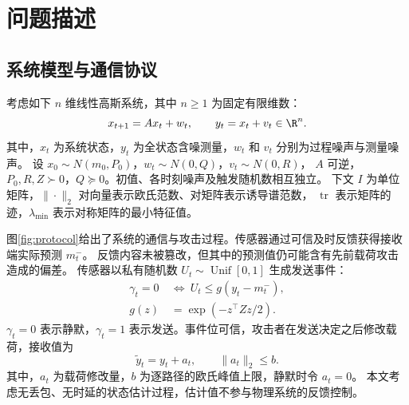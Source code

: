 \section{问题描述}
\label{sec:model}
\subsection{系统模型与通信协议}
考虑如下 $n$ 维线性高斯系统，其中 $n\ge1$ 为固定有限维数：
\begin{equation}
 x_{t+1}=Ax_t+w_t,\qquad y_t=x_t+v_t\in\R^n.
 \label{eq:model}
\end{equation}
其中，$x_t$ 为系统状态，$y_t$ 为全状态含噪测量，$w_t$ 和 $v_t$ 分别为过程噪声与测量噪声。
设 $x_0\sim N(m_0,P_0)$，$w_t\sim N(0,Q)$，$v_t\sim N(0,R)$，
$A$ 可逆，$P_0,R,Z\succ0$，$Q\succeq0$。初值、各时刻噪声及触发随机数相互独立。
下文 $I$ 为单位矩阵，$\|\cdot\|_2$ 对向量表示欧氏范数、对矩阵表示诱导谱范数，
$\operatorname{tr}$ 表示矩阵的迹，$\lambda_{\min}$ 表示对称矩阵的最小特征值。

图\ref{fig:protocol}给出了系统的通信与攻击过程。传感器通过可信及时反馈获得接收端实际预测 $m_t^-$。
反馈内容未被篡改，但其中的预测值仍可能含有先前载荷攻击造成的偏差。
传感器以私有随机数 $U_t\sim\operatorname{Unif}[0,1]$ 生成发送事件：
\begin{equation}
 \begin{aligned}
 \gamma_t=0\ &\Longleftrightarrow\ U_t\le g(y_t-m_t^-),\\
 g(z)&=\exp(-z^\top Zz/2).
 \end{aligned}
 \label{eq:trigger}
\end{equation}
$\gamma_t=0$ 表示静默，$\gamma_t=1$ 表示发送。事件位可信，攻击者在发送决定之后修改载荷，接收值为
\begin{equation}
 \widetilde y_t=y_t+a_t,\qquad \|a_t\|_2\le b.
 \label{eq:peak}
\end{equation}
其中，$a_t$ 为载荷修改量，$b$ 为逐路径的欧氏峰值上限，静默时令 $a_t=0$。
本文考虑无丢包、无时延的状态估计过程，估计值不参与物理系统的反馈控制。



